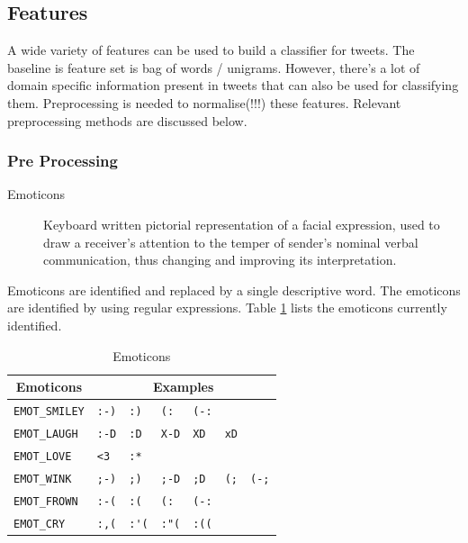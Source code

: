 \subsection{Features}
A wide variety of features can be used to build a classifier for tweets.
The baseline is feature set is bag of words / unigrams.
However, there's a lot of domain specific information present in tweets that can also be used for classifying them.
Preprocessing is needed to normalise(!!!) these features. Relevant preprocessing methods are discussed below.

\subsubsection{Pre Processing}
	\begin{description}
	\item[Emoticons]{Keyboard written pictorial representation of a facial expression,
						used to draw a receiver's attention to the temper of sender's nominal verbal communication,
						thus changing and improving its interpretation. %
					}
	\end{description}
Emoticons are identified and replaced by a single descriptive word.
The emoticons are identified by using regular expressions.
Table \ref{table:emot} lists the emoticons currently identified.

\begin{table}[h]
\centering
	\begin{tabular}{|l|llllll|}
	
	\hline
		\multicolumn{1}{|c|}{Emoticons} &
		\multicolumn{6}{|c|}{Examples} \\
	\hline
	\verb+EMOT_SMILEY+ 	& \verb+:-)+ 	& \verb+:)+ 	& \verb+(:+ 	& \verb+(-:+ 	& \verb++ 	& \verb++ \\
	\verb+EMOT_LAUGH+ 	& \verb+:-D+ 	& \verb+:D+ 	& \verb+X-D+ 	& \verb+XD+ 	& \verb+xD+ 	& \verb++ \\
	\verb+EMOT_LOVE+ 	& \verb+<3+ 	& \verb+:*+ 	& \verb++ 	& \verb++ 	& \verb++ 	& \verb++ \\
	\verb+EMOT_WINK+ 	& \verb+;-)+ 	& \verb+;)+ 	& \verb+;-D+ 	& \verb+;D+ 	& \verb+(;+ 	& \verb+(-;+ \\
	\verb+EMOT_FROWN+ 	& \verb+:-(+ 	& \verb+:(+ 	& \verb+(:+ 	& \verb+(-:+ 	& \verb++ 	& \verb++ \\
	\verb+EMOT_CRY+ 	& \verb+:,(+ 	& \verb+:'(+ 	& \verb+:"(+ 	& \verb+:((+ 	& \verb++ 	& \verb++ \\
	\hline
	
	\end{tabular}
\caption{Emoticons}
\label{table:emot}
\end{table}

